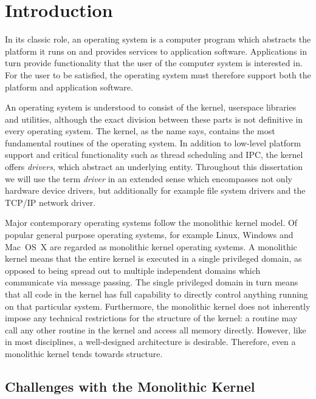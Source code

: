 %

\section{Introduction}
\label{chap:introduction}

In its classic role, an operating system is a computer program
which abstracts the platform it runs on and provides services to
application software.  Applications in turn provide functionality that
the user of the computer system is interested in.  For the user to be
satisfied, the operating system must therefore support both the platform
and application software.

An operating system is understood to consist of the kernel, userspace
libraries and utilities, although the exact division between these
parts is not definitive in every operating system.  The kernel, as the
name says, contains the most fundamental routines of the operating
system.  In addition to low-level platform support and critical
functionality such as thread scheduling and IPC, the kernel offers
\textit{drivers}, which abstract an underlying entity.  Throughout this
dissertation we will use the term \textit{driver} in an extended sense
which encompasses not only hardware device drivers, but additionally
for example file system drivers and the TCP/IP network driver.

Major contemporary operating systems follow the monolithic kernel model.
Of popular general purpose operating systems, for example Linux, Windows
and Mac~OS~X are regarded as monolithic kernel operating systems.
A monolithic kernel means that the entire kernel is executed in a single
privileged domain, as opposed to being spread out to multiple independent
domains which communicate via message passing.  The single privileged
domain in turn means that all code in the kernel has full capability to
directly control anything running on that particular system.  Furthermore,
the monolithic kernel does not inherently impose any technical
restrictions for the structure of the kernel: a routine may call any other
routine in the kernel and access all memory directly.  However, like
in most disciplines, a well-designed architecture is desirable.
Therefore, even a monolithic kernel tends towards structure.

\subsection{Challenges with the Monolithic Kernel}
\label{sect:challenge}

